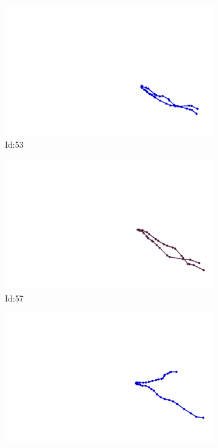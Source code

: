 \documentclass[12pt,twoside]{report}
\begin{document}
\begin{figure}
\centering
\begin{subfigure}[b]{0.20\textwidth}
\centering
\includegraphics[width=\textwidth]{../../trajectories/53.png}
\caption{Id:53}
\end{subfigure}
\begin{subfigure}[b]{0.20\textwidth}
\centering
\includegraphics[width=\textwidth]{../../trajectories/57.png}
\caption{Id:57}
\end{subfigure}
\begin{subfigure}[b]{0.20\textwidth}
\centering
\includegraphics[width=\textwidth]{../../trajectories/312.png}

\end{subfigure}
\end{figure}
\end{document}
